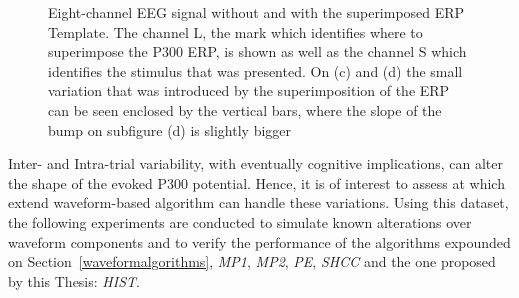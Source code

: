 \begin{figure}[h!]
\centering
{}
\caption[Pseudo-real Dataset EEG Streams]{Eight-channel EEG signal without and with the superimposed ERP Template. The channel L, the mark which identifies where to superimpose the P300 ERP, is shown as well as the channel S which identifies the stimulus that was presented. On (c) and (d) the small variation that was introduced by the superimposition of the ERP can be seen enclosed by the vertical bars, where the slope of the bump on subfigure (d) is slightly bigger}
\label{fig:gains}
\end{figure}

Inter- and Intra-trial variability, with eventually cognitive implications, can alter the shape of the evoked P300 potential.  Hence, it is of interest to assess  at which extend waveform-based algorithm can handle these variations. Using this dataset, the following experiments are conducted to simulate known alterations over waveform components and to verify the performance of the algorithms expounded on Section~\ref{waveformalgorithms}, \textit{MP1}, \textit{MP2}, \textit{PE}, \textit{SHCC} and the one proposed by this Thesis: \textit{HIST}.

